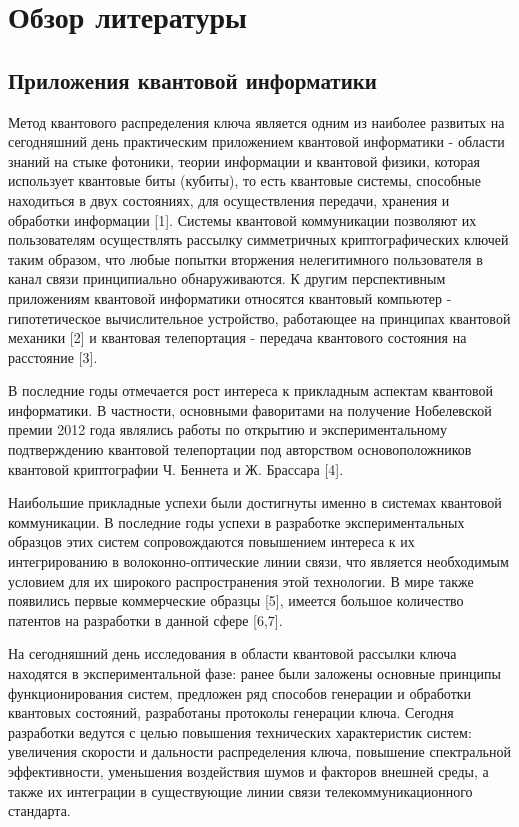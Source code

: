 \chapter{Обзор литературы}
\section{Приложения квантовой информатики} \label{sec:ch1/sec1}

Метод квантового распределения ключа является одним из наиболее развитых на сегодняшний день практическим приложением квантовой информатики - области знаний на стыке фотоники, теории информации и квантовой физики, которая использует квантовые биты (кубиты), то есть квантовые системы, способные находиться в двух состояниях, для осуществления передачи, хранения и обработки информации [1]. Системы квантовой коммуникации позволяют их пользователям осуществлять рассылку симметричных криптографических ключей таким образом, что любые попытки вторжения нелегитимного пользователя в канал связи принципиально обнаруживаются. К другим перспективным приложениям квантовой информатики относятся квантовый компьютер - гипотетическое вычислительное устройство, работающее на принципах квантовой механики [2] и квантовая телепортация - передача квантового состояния на расстояние [3].


В последние годы отмечается рост интереса к прикладным аспектам квантовой информатики. В частности, основными фаворитами на получение Нобелевской премии 2012 года являлись работы по открытию и экспериментальному подтверждению квантовой телепортации под авторством основоположников квантовой криптографии Ч. Беннета и Ж. Брассара [4].  


Наибольшие прикладные успехи были достигнуты именно в системах квантовой коммуникации. В последние годы успехи в разработке экспериментальных образцов этих систем сопровождаются повышением интереса к их интегрированию в волоконно-оптические линии связи, что является необходимым условием для их широкого распространения этой технологии. В мире также появились первые коммерческие образцы [5], имеется большое количество патентов на разработки в данной сфере [6,7].


На сегодняшний день исследования в области квантовой рассылки ключа находятся в экспериментальной фазе: ранее были заложены основные принципы функционирования систем, предложен ряд способов генерации и обработки квантовых состояний, разработаны протоколы генерации ключа. Сегодня разработки ведутся с целью повышения технических характеристик систем: увеличения скорости и дальности распределения ключа, повышение спектральной эффективности, уменьшения воздействия шумов и факторов внешней среды, а также их интеграции в существующие линии связи телекоммуникационного стандарта. 


